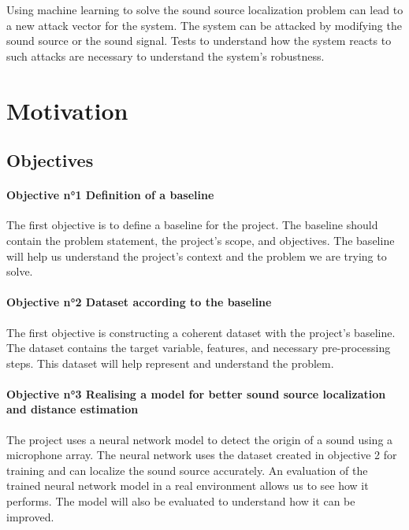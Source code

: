 Using machine learning to solve the sound source localization problem can lead to a new attack vector for the system. The system can be attacked by modifying the sound source or the sound signal. Tests to understand how the system reacts to such attacks are necessary to understand the system's robustness.

\section{Motivation}
\label{intro:motivation}

\subsection{Objectives}

\paragraph{Objective n°1 Definition of a baseline}

The first objective is to define a baseline for the project. The baseline should contain the problem statement, the project's scope, and objectives. The baseline will help us understand the project's context and the problem we are trying to solve.

\paragraph{Objective n°2 Dataset according to the baseline}

The first objective is constructing a coherent dataset with the project's baseline. The dataset contains the target variable, features, and necessary pre-processing steps. This dataset will help represent and understand the problem.

\paragraph{Objective n°3 Realising a model for better sound source localization and distance estimation}

The project uses a neural network model to detect the origin of a sound using a microphone array. The neural network uses the dataset created in objective 2 for training and can localize the sound source accurately. An evaluation of the trained neural network model in a real environment allows us to see how it performs. The model will also be evaluated to understand how it can be improved.

